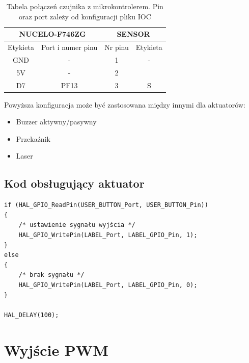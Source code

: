 \documentclass[11pt, a4paper]{article}
\begin{document}
\vspace{0.5cm}
\begin{table}[h!]
    \centering
    \begin{tabular}{|c|c|c|c|} 
        \hline
        \multicolumn{2}{|c|}{NUCELO-F746ZG} & \multicolumn{2}{c|}{SENSOR}   \\ 
        \hline
        Etykieta & Port i numer pinu        & Nr pinu & Etykieta            \\ 
        \hline
        GND     & -                         & 1       & -                   \\
        5V      & -                         & 2       &                     \\
        D7      & PF13                      & 3       & S                   \\
        \hline
    \end{tabular}
    \caption{Tabela połączeń czujnika z mikrokontrolerem. Pin oraz port zależy od konfiguracji pliku IOC}
\end{table}
\vspace{0.5cm}

Powyższa konfiguracja może być zastosowana między innymi dla aktuatorów:

\begin{itemize}
    \item Buzzer aktywny/pasywny
    \item Przekaźnik
    \item Laser
\end{itemize}

\subsection* {Kod obsługujący aktuator}
\begin{lstlisting}[style=lstC, caption={Kod pętli \texttt{while()}}]
if (HAL_GPIO_ReadPin(USER_BUTTON_Port, USER_BUTTON_Pin))
{
    /* ustawienie sygnału wyjścia */
    HAL_GPIO_WritePin(LABEL_Port, LABEL_GPIO_Pin, 1);
}
else
{
    /* brak sygnału */
    HAL_GPIO_WritePin(LABEL_Port, LABEL_GPIO_Pin, 0);
}

HAL_DELAY(100);
\end{lstlisting}





\newpage


\section* {Wyjście PWM}
\end{document}
